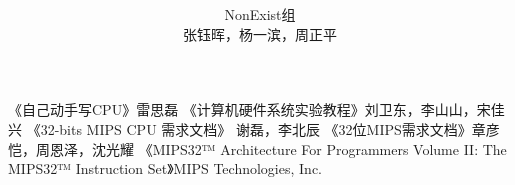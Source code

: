 

\title{ \\ }
\date{}
\author{NonExist组\\张钰晖，杨一滨，周正平}

\maketitle
\clearpage
\tableofcontents









\begin{thebibliography}{9}
     《自己动手写CPU》雷思磊
     《计算机硬件系统实验教程》刘卫东，李山山，宋佳兴
     《32-bits MIPS CPU 需求文档》 谢磊，李北辰
     《32位MIPS需求文档》章彦恺，周恩泽，沈光耀
     《MIPS32™ Architecture For Programmers Volume II: The MIPS32™ Instruction Set》MIPS Technologies, Inc.
\end{thebibliography}


